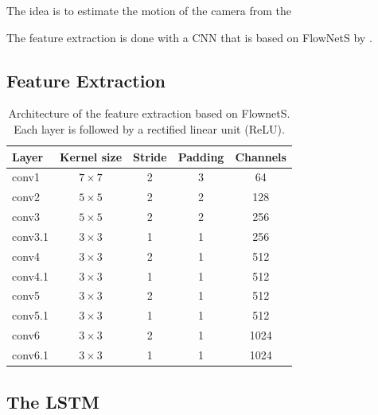 		The idea is to estimate the motion of the camera from the 
		
		The feature extraction is done with a CNN that is based on FlowNetS by \cite{dosovitskiy2015flownet}.
		
		
		\subsection{Feature Extraction}
			\begin{table}[tb]
				\small
				\begin{center}
					\begin{tabular}{|l|c|c|c|c|}
						\hline
						Layer 		& Kernel size 		& Stride 		& Padding 		& Channels 		\\ \hline
						conv1 		& $7 \times 7$		& 2 			& 3 			& 64 			\\ \hline
						conv2 		& $5 \times 5$		& 2 			& 2 			& 128 			\\ \hline
						conv3 		& $5 \times 5$		& 2 			& 2 			& 256			\\ \hline
						conv3.1 	& $3 \times 3$		& 1 			& 1 			& 256 			\\ \hline
						conv4 		& $3 \times 3$		& 2 			& 1 			& 512 			\\ \hline
						conv4.1 	& $3 \times 3$		& 1 			& 1 			& 512 			\\ \hline
						conv5 		& $3 \times 3$		& 2 			& 1 			& 512 			\\ \hline
						conv5.1 	& $3 \times 3$		& 1 			& 1 			& 512 			\\ \hline
						conv6 		& $3 \times 3$		& 2 			& 1 			& 1024 			\\ \hline
						conv6.1 	& $3 \times 3$		& 1 			& 1 			& 1024 			\\ \hline
					\end{tabular}
				\end{center}
				\caption[Architecture of the feature extraction based on FlownetS]
						{Architecture of the feature extraction based on FlownetS. 
						 Each layer is followed by a rectified linear unit (ReLU).}
				\label{tbl:first_part_of_flownets}
			\end{table}
		
		\subsection{The LSTM}
	
